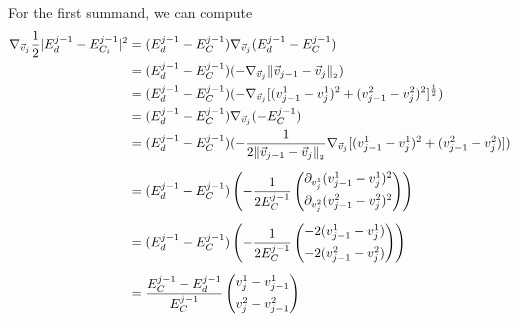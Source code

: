 \begin{proposition}
	For the first summand, we can compute 
	\begin{align*}
		\nabla_{\vec{v}_{j}} \frac{1}{2} | E^{j-1}_d - E^{j-1}_{C_i}|^2 &= (E^{j-1}_d - E^{j-1}_C) \nabla_{\vec{v}_j} (E^{j-1}_d - E^{j-1}_C) \\
		&= (E^{j-1}_d - E^{j-1}_C) (- \nabla_{\vec{v}_{j}} \norm[\vec{v}_{j-1} - \vec{v}_{j}] ) \\
		&= (E^{j-1}_d - E^{j-1}_C) (- \nabla_{\vec{v}_j} [(v_{j-1}^1 - v_{j}^1)^2 + (v_{j-1}^2 - v_{j}^2)^2]^{\frac{1}{2}} ) \\
		&= (E^{j-1}_d - E^{j-1}_C) \nabla_{\vec{v}_j} ( - E^{j-1}_C) \\
		&= (E^{j-1}_d - E^{j-1}_C) (- \frac{1}{2 \norm[\vec{v}_{j-1} - \vec{v}_{j}]} \nabla_{\vec{v}_j} [(v_{j-1}^1 - v_{j}^1)^2 + (v_{j-1}^2 - v_{j}^2)]) \\[0.5em] 
		&= (E^{j-1}_d - E^{j-1}_C) \left(- \frac{1}{2 E^{j-1}_C} \begin{pmatrix}
			\partial_{v_{j}^1} (v_{j-1}^1 - v_{j}^1)^2 \\[0.5em]
			\partial_{v_{j}^2} (v_{j-1}^2 - v_{j}^2)^2
		\end{pmatrix}\right) \\[0.5em]
		&= (E^{j-1}_d - E^{j-1}_C)  \left( - \frac{1}{2 E^{j-1}_C} \begin{pmatrix}
			 -2(v_{j-1}^1 - v_{j}^1) \\[0.5em]
			 -2(v_{j-1}^2 - v_{j}^2)
		\end{pmatrix}\right) \\[0.5em] 
		&= \frac{E^{j-1}_C - E^{j-1}_d}{E^{j-1}_C} \begin{pmatrix}
			v_{j}^1 - v_{j-1}^1 \\[0.5em]
			v_{j}^2 - v_{j-1}^2
	   \end{pmatrix} 
	\end{align*}


\end{proposition}
